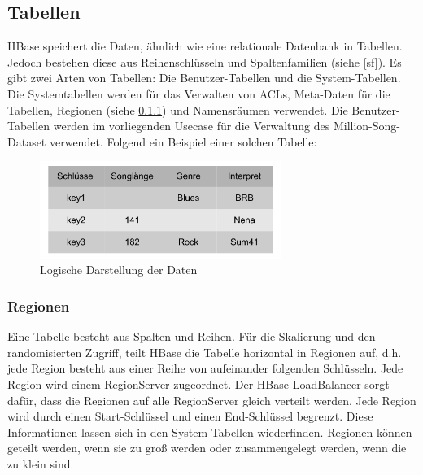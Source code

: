 \subsection{Tabellen}
HBase speichert die Daten, ähnlich wie eine relationale Datenbank in Tabellen. Jedoch bestehen diese aus Reihenschlüsseln und Spaltenfamilien (siehe \ref{sf}). Es gibt zwei Arten von Tabellen: Die Benutzer-Tabellen und die System-Tabellen.
Die Systemtabellen werden für das Verwalten von \acp{ACL}, Meta-Daten für die Tabellen, Regionen (siehe \ref{region}) und Namensräumen verwendet. Die Benutzer-Tabellen werden im vorliegenden Usecase für die Verwaltung des Million-Song-Dataset verwendet. Folgend ein Beispiel einer solchen Tabelle:

\begin{figure}[htbp] 
  \centering
     \includegraphics[width=0.7\textwidth]{images/logisch.pdf}
  \caption{Logische Darstellung der Daten}
  \label{fig:Logische Darstellung der Daten}
\end{figure}



\subsubsection{Regionen}\label{region}
Eine Tabelle besteht aus Spalten und Reihen. Für die Skalierung  und den randomisierten Zugriff, teilt HBase die Tabelle horizontal in Regionen auf, d.h. jede Region besteht aus einer Reihe von aufeinander folgenden Schlüsseln. Jede Region wird einem RegionServer zugeordnet. Der HBase LoadBalancer sorgt dafür, dass die Regionen auf alle RegionServer gleich verteilt werden. Jede Region wird durch einen Start-Schlüssel und einen End-Schlüssel begrenzt. Diese Informationen lassen sich in den System-Tabellen wiederfinden. Regionen können geteilt werden, wenn sie zu groß werden oder zusammengelegt werden, wenn die zu klein sind.

